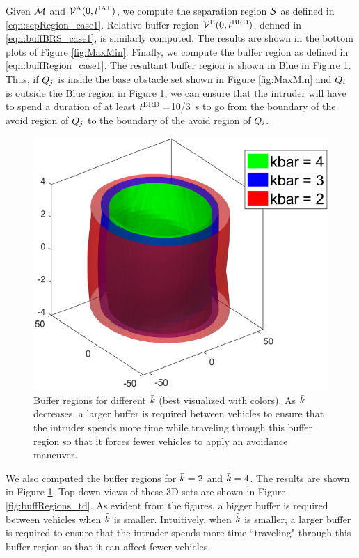 Given $\mathcal{M}$ and $\mathcal{V}^{\text{A}}(0, t^\text{IAT})$, we compute the separation region $\mathcal{S}$ as defined in \eqref{eqn:sepRegion_case1}. Relative buffer region $\mathcal{V}^{\text{B}}(0, t^\text{BRD})$, defined in \eqref{eqn:buffBRS_case1}, is similarly computed. The results are shown in the bottom plots of Figure \ref{fig:MaxMin}. Finally, we compute the buffer region as defined in \eqref{eqn:buffRegion_case1}. The resultant buffer region is shown in Blue in Figure \ref{fig:buffRegions}. Thus, if $Q_j$ is inside the base obstacle set shown in Figure \ref{fig:MaxMin} and $Q_i$ is outside the Blue region in Figure \ref{fig:buffRegions}, we can ensure that the intruder will have to spend a duration of at least $t^\text{BRD} = $\SI{10/3}{\s} to go from the boundary of the avoid region of $Q_j$ to the boundary of the avoid region of $Q_i$. 
\begin{figure}[H]
  \centering
  \includegraphics[width=0.8\columnwidth]{"figs/bufferRegions_3D"}
  \caption{Buffer regions for different $\bar{k}$ (best visualized with colors). As $\bar{k}$ decreases, a larger buffer is required between vehicles to ensure that the intruder spends more time while traveling through this buffer region so that it forces fewer vehicles to apply an avoidance maneuver.}
  \label{fig:buffRegions}
\end{figure}
We also computed the buffer regions for $\bar{k} = 2$ and $\bar{k} = 4$. The results are shown in Figure \ref{fig:buffRegions}. Top-down views of these 3D sets are shown in Figure \ref{fig:buffRegions_td}. As evident from the figures, a bigger buffer is required between vehicles when $\bar{k}$ is smaller. Intuitively, when $\bar{k}$ is smaller, a larger buffer is required to ensure that the intruder spends more time ``traveling" through this buffer region so that it can affect fewer vehicles.             
